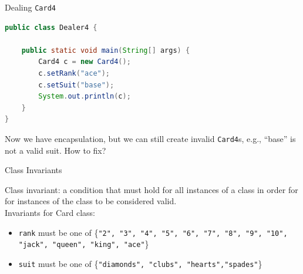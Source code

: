 \documentclass{beamer}
\begin{document}
\begin{frame}[fragile]{Dealing {\tt Card4}}


\begin{lstlisting}[language=Java]
public class Dealer4 {

    public static void main(String[] args) {
        Card4 c = new Card4();
        c.setRank("ace");
        c.setSuit("base");
        System.out.println(c);
    }
}
\end{lstlisting}

Now we have encapsulation, but we can still create invalid {\tt Card4}s, e.g., ``base'' is not a valid suit.  How to fix?

\end{frame}

\begin{frame}[fragile]{Class Invariants}


Class invariant: a condition that must hold for all instances of a class in order for for instances of the class to be considered valid.\\
\vspace{.1in}
Invariants for Card class:
\begin{itemize}
\item {\tt rank} must be one of \{{\tt "2", "3", "4", "5", "6", "7", "8", "9",
         "10", "jack", "queen", "king", "ace"}\}
\item {\tt suit} must be one of \{{\tt "diamonds", "clubs", "hearts","spades"}\}
\end{itemize}


\end{frame}
\end{document}
